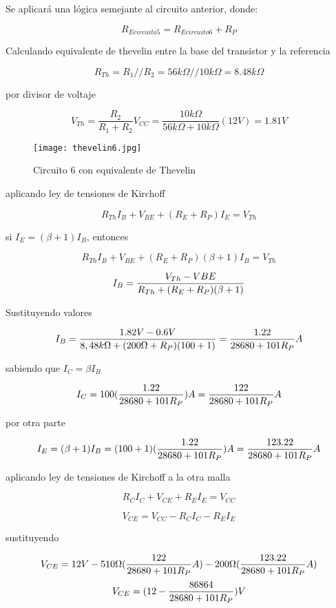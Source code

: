 \documentclass[10pt, a4paper]{article}
\begin{document}
    Se aplicará una lógica semejante al circuito anterior, donde:

    $$R_{Ecircuito5} = R_{Ecircuito6} + R_P$$

    Calculando equivalente de thevelin entre la base del transistor y la referencia

    $$R_{Th} = R_1 // R_2 = 56k\Omega // 10k\Omega = 8.48k\Omega$$
    
    por divisor de voltaje

    $$V_{Th} = \frac{R_2}{R_1 + R_2} V_{CC} = \frac{10k\Omega}{56k\Omega + 10k\Omega} (12V) = 1.81V$$

    \begin{figure}[h!]
        \centering
        \texttt{[image: thevelin6.jpg]} \par
        \caption{\label{fig:14} Circuito 6 con equivalente de Thevelin}
    \end{figure}

    aplicando ley de tensiones de Kirchoff

    $$R_{Th}I_B + V_{BE} + (R_E + R_P)I_E = V_{Th}$$

    si $I_E = (\beta + 1)I_B$, entonces

    $$R_{Th}I_B + V_{BE} + (R_E + R_P)(\beta + 1)I_B = V_{Th}$$

    $$I_B = {V_{Th} - V{BE} \over R_{Th} + (R_E + R_P)(\beta + 1)}$$

    Sustituyendo valores

    $$I_B = {1.82V - 0.6V \over 8,48k\Omega + (200\Omega + R_P)(100 + 1)} = {1.22 \over 28680 +101R_P} A$$

    sabiendo que $I_C = \beta I_B$

    $$I_C = 100({1.22 \over 28680 +101R_P})A = {122 \over 28680 +101R_P}A$$

    por otra parte

    $$I_E = (\beta + 1)I_B = (100 + 1)({1.22 \over 28680 +101R_P})A = {123.22 \over 28680 +101R_P}A$$

    aplicando ley de tensiones de Kirchoff a la otra malla

    $$R_{C}I_C + V_{CE} + R_EI_E = V_{CC}$$

    $$V_{CE} = V_{CC} - R_{C}I_C - R_EI_E$$

    sustituyendo

    $$V_{CE} = 12V - 510\Omega ({122 \over 28680 +101R_P}A) - 200\Omega ({123.22 \over 28680 +101R_P}A)$$
    $$V_{CE} = (12 - {86864 \over 28680 +101R_P})V$$
\end{document}
